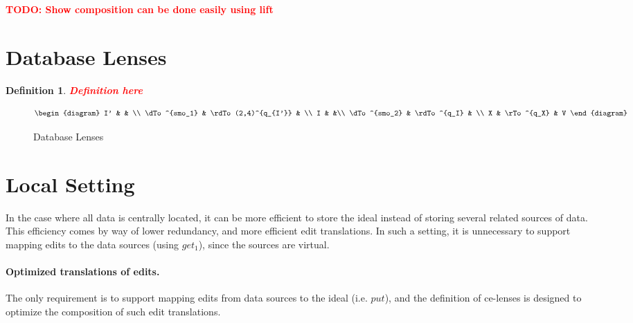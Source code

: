 \documentclass[a4paper,10pt]{article}
\newtheorem{definition}{Definition}
\newcommand{\finish}[1]{#1}
\newcommand{\comment}[1]{\finish{\textbf{\textcolor{red}{#1}}}}
\begin{document}
\comment{TODO: Show composition can be done easily using lift} 

\section{Database Lenses}

\begin{definition}
\comment{Definition here}
\end{definition}


\begin{figure}[ht]
\begin{displaymath}
\begin{diagram}
I' & & \\
\dTo^{smo_1} & \rdTo(2,4)^{q_{I'}} & \\
I & &\\
\dTo^{smo_2} & \rdTo^{q_I} & \\
X & \rTo^{q_X} & V
\end{diagram}
\end{displaymath}
\caption{Database Lenses}
\label{fig:database-lens}
\end{figure}


\section{Local Setting}
  In the case where all data is centrally located, it can be more efficient to store the ideal instead of storing several related sources of data. This efficiency comes by way of lower redundancy, and more efficient edit translations. In such a setting, it is unnecessary to support mapping edits to the data sources (using $get_1$), since the sources are virtual. 

  \paragraph*{Optimized translations of edits.}
    The only requirement is to support mapping edits from data sources to the ideal (i.e. $put$), and the definition of ce-lenses is designed to optimize the composition of such edit translations. 
  
\end{document}
